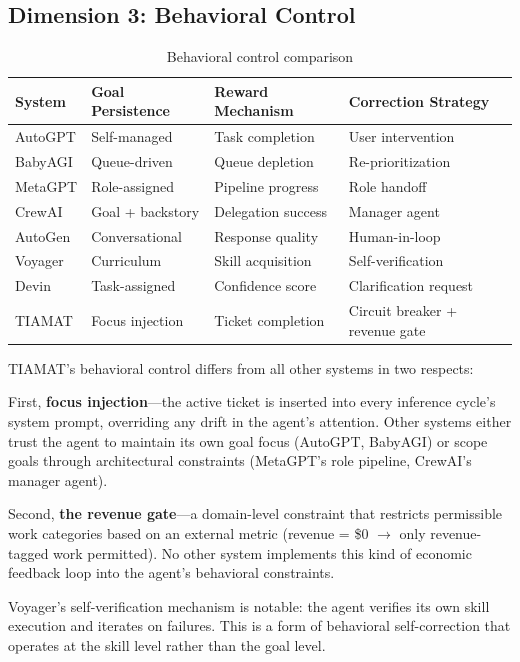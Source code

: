 \documentclass[12pt,a4paper]{article}
\begin{document}
\subsection{Dimension 3: Behavioral Control}

\begin{table}[h]
\centering
\small
\begin{tabular}{@{}p{2.2cm}p{3cm}p{3cm}p{4cm}@{}}
\toprule
\textbf{System} & \textbf{Goal Persistence} & \textbf{Reward Mechanism} & \textbf{Correction Strategy} \\
\midrule
AutoGPT & Self-managed & Task completion & User intervention \\
BabyAGI & Queue-driven & Queue depletion & Re-prioritization \\
MetaGPT & Role-assigned & Pipeline progress & Role handoff \\
CrewAI & Goal + backstory & Delegation success & Manager agent \\
AutoGen & Conversational & Response quality & Human-in-loop \\
Voyager & Curriculum & Skill acquisition & Self-verification \\
Devin & Task-assigned & Confidence score & Clarification request \\
TIAMAT & Focus injection & Ticket completion & Circuit breaker + revenue gate \\
\bottomrule
\end{tabular}
\caption{Behavioral control comparison}
\label{tab:behavior}
\end{table}

TIAMAT's behavioral control differs from all other systems in two respects:

First, \textbf{focus injection}---the active ticket is inserted into every inference cycle's system prompt, overriding any drift in the agent's attention. Other systems either trust the agent to maintain its own goal focus (AutoGPT, BabyAGI) or scope goals through architectural constraints (MetaGPT's role pipeline, CrewAI's manager agent).

Second, \textbf{the revenue gate}---a domain-level constraint that restricts permissible work categories based on an external metric (revenue = \$0 $\rightarrow$ only revenue-tagged work permitted). No other system implements this kind of economic feedback loop into the agent's behavioral constraints.

Voyager's self-verification mechanism is notable: the agent verifies its own skill execution and iterates on failures. This is a form of behavioral self-correction that operates at the skill level rather than the goal level.
\end{document}
